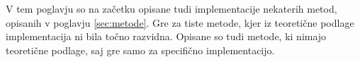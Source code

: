 V tem poglavju so na začetku opisane tudi implementacije nekaterih metod, opisanih v poglavju \ref{sec:metode}. Gre za tiste metode, kjer iz teoretične podlage implementacija ni bila točno razvidna. Opisane so tudi metode, ki nimajo teoretične podlage, saj gre samo za specifično implementacijo.


\renewcommand{\folder}{./pogl/03-eksperimenti}





